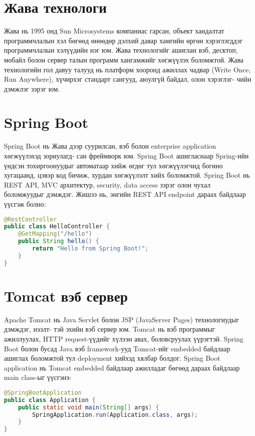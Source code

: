 \section{Жава технологи}
Жава нь 1995 онд Sun Microsystems компаниас гарсан, объект хандалтат программчлалын хэл бөгөөд өнөөдөр дэлхий даяар хамгийн өргөн хэрэглэгддэг программчлалын хэлүүдийн нэг юм. Жава технологийг ашиглан вэб, десктоп, мобайл болон сервер талын программ хангамжийг хөгжүүлэх боломжтой. Жава технологийн гол давуу талууд нь платформ хооронд ажиллах чадвар (Write Once, Run Anywhere), хүчирхэг стандарт сангууд, аюулгүй байдал, олон хэрэглэг- чийн дэмжлэг зэрэг юм. 

\section{Spring Boot}
Spring Boot нь Жава дээр суурилсан, вэб болон enterprise application хөгжүүлэхэд зориулагд- сан фреймворк юм. Spring Boot ашигласнаар Spring-ийн үндсэн тохиргоонуудыг автоматаар хийж өгдөг тул хөгжүүлэгчид богино хугацаанд, цэвэр код бичиж, хурдан хөгжүүлэлт хийх боломжтой. Spring Boot нь REST API, MVC архитектур, security, data access зэрэг олон чухал боломжуудыг дэмждэг. Жишээ нь, энгийн REST API endpoint дараах байдлаар үүсгэж болно:

\begin{lstlisting}[language=Java, caption=Spring Boot REST Controller, frame=single]
@RestController
public class HelloController {
	@GetMapping("/hello")
	public String hello() {
		return "Hello from Spring Boot!";
	}
}
\end{lstlisting}

\section{Tomcat вэб сервер}
Apache Tomcat нь Java Servlet болон JSP (JavaServer Pages) технологиудыг дэмждэг, нээлт- тэй эхийн вэб сервер юм. Tomcat нь вэб программыг ажиллуулах, HTTP request-үүдийг хүлээн авах, боловсруулах үүрэгтэй. Spring Boot болон бусад Java вэб framework-ууд Tomcat-ийг embedded байдлаар ашиглах боломжтой тул deployment хийхэд хялбар болдог. Spring Boot application нь Tomcat embedded байдлаар ажилладаг бөгөөд дараах байдлаар main class-ыг үүсгэнэ:

\begin{lstlisting}[language=Java, caption=Spring Boot main class, frame=single]
@SpringBootApplication
public class Application {
	public static void main(String[] args) {
		SpringApplication.run(Application.class, args);
	}
}
\end{lstlisting}

